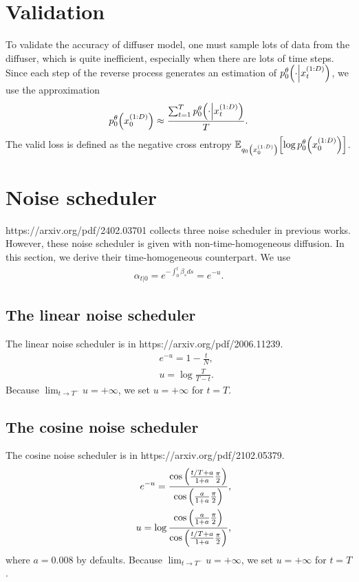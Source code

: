 \documentclass[10pt]{article}
\begin{document}
\section{Validation}
To validate the accuracy of diffuser model, one must sample lots of data from the diffuser, which is quite inefficient, especially when there are lots of time steps. Since each step of the reverse process generates an estimation of $p^\theta_0\qty(\cdot\middle|x^{(1:D)}_t)$, we use the approximation
\begin{eqnarray*}
  p^\theta_0\qty(x^{(1:D)}_0) \approx \frac{\sum_{t=1}^T p^\theta_0\qty(\cdot\middle|x^{(1:D)}_t)}{T}.
\end{eqnarray*}
The valid loss is defined as the negative cross entropy $\mathbb{E}_{q_0\qty(x^{(1:D)}_0)}\qty[\log p_0^\theta\qty(x^{(1:D)}_0)]$.

\section{Noise scheduler}

https://arxiv.org/pdf/2402.03701 collects three noise scheduler in previous works. However, these noise scheduler is given with non-time-homogeneous diffusion. In this section, we derive their time-homogeneous counterpart. We use
\begin{eqnarray*}
  \alpha_{t|0}= e^{-\int_0^t \beta_s ds} = e^{-u}.
\end{eqnarray*}

\subsection{The linear noise scheduler}
The linear noise scheduler is in https://arxiv.org/pdf/2006.11239.
\begin{eqnarray*}
  &&e^{-u} = 1 - \frac{t}{N},\\
  &&u = \log\frac{T}{T-t}.
\end{eqnarray*}
Because $\lim_{t\to T^-}u = +\infty$, we set $u=+\infty$ for $t=T$.

\subsection{The cosine noise scheduler}
The cosine noise scheduler is in https://arxiv.org/pdf/2102.05379.
\begin{eqnarray*}
  &&e^{-u} = \frac{\cos\qty(\frac{t/T+a}{1+a}\frac{\pi}{2})}{\cos\qty(\frac{a}{1+a}\frac{\pi}{2})},\\
  &&u = \log \frac{\cos\qty(\frac{a}{1+a}\frac{\pi}{2})}{\cos\qty(\frac{t/T+a}{1+a}\frac{\pi}{2})},
\end{eqnarray*}
where $a=0.008$ by defaults. Because $\lim_{t\to T^-}u = +\infty$, we set $u=+\infty$ for $t=T$.
\end{document}
